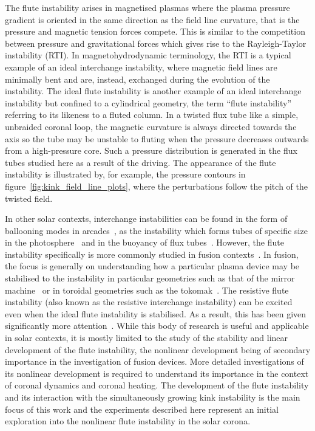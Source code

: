 \documentclass[fleqn,usenatbib]{mnras}
\begin{document}
The flute instability arises in magnetised plasmas where the plasma pressure
gradient is oriented in the same direction as the field line curvature, that is
the pressure and magnetic tension forces compete. This is similar to the
competition between pressure and gravitational forces which gives rise to the
Rayleigh-Taylor instability (RTI). In magnetohydrodynamic terminology, the RTI
is a typical example of an ideal interchange instability, where magnetic field
lines are minimally bent and are, instead, exchanged during the evolution of
the instability. The ideal flute instability is another example of an ideal
interchange instability but confined to a cylindrical geometry, the term
``flute instability'' referring to its likeness to a fluted column. In
a twisted flux tube like a simple, unbraided coronal loop, the magnetic
curvature is always directed towards the axis so the tube may be unstable to
fluting when the pressure decreases outwards from a high-pressure core. Such
a pressure distribution is generated in the flux tubes studied here as a result
of the driving. The appearance of the flute instability is illustrated by, for
example, the pressure contours in figure~\ref{fig:kink_field_line_plots}, where
the perturbations follow the pitch of the twisted field. 

In other solar contexts, interchange instabilities can be found in the form of
ballooning modes in arcades~\citep{hoodBallooningInstabilitiesSolar1986}, as
the instability which forms tubes of specific size in the
photosphere~\citep{bunteInterchangeInstabilitySolar1993} and in the buoyancy of
flux tubes~\citep{schuesslerInterchangeInstabilitySmall1984}. However, the
flute instability specifically is more commonly studied in fusion
contexts~\citep{mikhailovskiiInstabilitiesConfinedPlasma1998,zhengAdvancedTokamakStability2015,wessonHydromagneticStabilityTokamaks1978}.
In fusion, the focus is generally on understanding how a particular plasma
device may be stabilised to the instability in particular geometries such as
that of the mirror machine~\citep{jungwirthTheoryFluteInstability1965} or in
toroidal geometries such as the
tokomak~\citep{shafranovFluteInstabilityCurrentcarrying1968}. The resistive
flute instability (also known as the resistive interchange instability) can be
excited even when the ideal flute instability is stabilised. As a result, this
has been given significantly more
attention~\citet{johnsonResistiveInterchangesNegativeV1967,correa-restrepoResistiveBallooningModes1983}.
While this body of research is useful and applicable in solar contexts, it is
mostly limited to the study of the stability and linear development of the
flute instability, the nonlinear development being of secondary importance in
the investigation of fusion devices. More detailed investigations of its
nonlinear development is required to understand its importance in the context
of coronal dynamics and coronal heating. The development of the flute
instability and its interaction with the simultaneously growing kink
instability is the main focus of this work and the experiments described here
represent an initial exploration into the nonlinear flute instability in the
solar corona.
\end{document}
